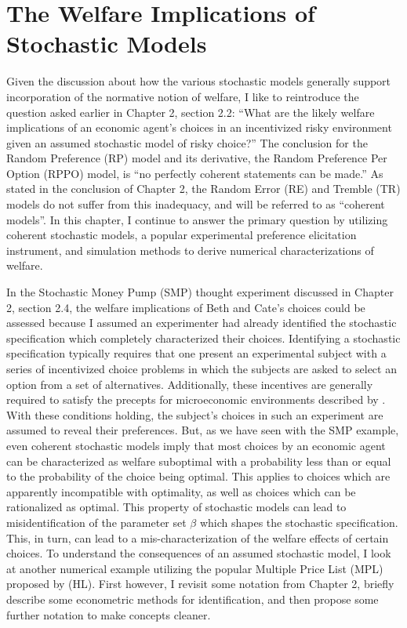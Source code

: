 \documentclass[../main.tex]{subfiles}
\begin{document}
\onehalfspacing
\setcounter{chapter}{2}

\chapter{The Welfare Implications of Stochastic Models}

\lltoc %

Given the discussion about how the various stochastic models generally support incorporation of the normative notion of welfare, I like to reintroduce the question asked earlier in Chapter 2, section 2.2:
\enquote{What are the likely welfare implications of an economic agent's choices in an incentivized risky environment given an assumed stochastic model of risky choice?}
The conclusion for the Random Preference (RP) model and its derivative, the Random Preference Per Option (RPPO) model, is \enquote{no perfectly coherent statements can be made.}
As stated in the conclusion of Chapter 2, the Random Error (RE) and Tremble (TR) models do not suffer from this inadequacy, and will be referred to as \enquote{coherent models}. 
In this chapter, I continue to answer the primary question by utilizing coherent stochastic models, a popular experimental preference elicitation instrument, and simulation methods to derive numerical characterizations of welfare.

In the Stochastic Money Pump (SMP) thought experiment discussed in Chapter 2, section 2.4, the welfare implications of Beth and Cate's choices could be assessed because I assumed an experimenter had already identified the stochastic specification which completely characterized their choices.
Identifying a stochastic specification typically requires that one present an experimental subject with a series of incentivized choice problems in which the subjects are asked to select an option from a set of alternatives.
Additionally, these incentives are generally required to satisfy the precepts for microeconomic environments described by \textcite{Smith1982}.
With these conditions holding, the subject's choices in such an experiment are assumed to reveal their preferences.
But, as we have seen with the SMP example, even coherent stochastic models imply that most choices by an economic agent can be characterized as welfare suboptimal with a probability less than or equal to the probability of the choice being optimal.
This applies to choices which are apparently incompatible with optimality, as well as choices which can be rationalized as optimal.
This property of stochastic models can lead to misidentification of the parameter set $\beta$ which shapes the stochastic specification.
This, in turn, can lead to a mis-characterization of the welfare effects of certain choices.
To understand the consequences of an assumed stochastic model, I look at another numerical example utilizing the popular Multiple Price List (MPL) proposed by \textcite{Holt2002} (HL).
First however, I revisit some notation from Chapter 2, briefly describe some econometric methods for identification, and then propose some further notation to make concepts cleaner.
\end{document}
